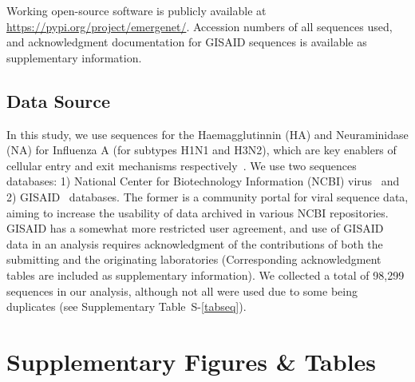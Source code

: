 \documentclass[onecolumn, compsoc,10pt]{IEEEtran}
\def\SUPPLEMENTARY{Supplementary\xspace}
\begin{document}
Working open-source software is publicly available at \href{https://pypi.org/project/quasinet/}{https://pypi.org/project/emergenet/}.
Accession numbers of all sequences used, and acknowledgment documentation for GISAID sequences is available as supplementary information.


\subsection*{Data Source}

In this study, we use sequences for the Haemagglutinnin (HA)  and Neuraminidase (NA) for Influenza A (for subtypes H1N1 and H3N2), which are key enablers of cellular entry and exit mechanisms respectively~\cite{mcauley2019influenza}. We use two sequences databases: 1) National Center for Biotechnology Information (NCBI) virus~\cite{hatcher2017virus} and 2) GISAID~\cite{bogner2006global} databases. The former is a community portal for viral sequence data, aiming to increase the usability of data archived in various NCBI repositories. GISAID has a somewhat more restricted user agreement, and use of GISAID data in an analysis requires acknowledgment of the contributions of both the submitting and the originating laboratories (Corresponding acknowledgment tables are included as supplementary information). We collected a total of 98,299 sequences in our analysis, although not all were used due to some being duplicates (see \SUPPLEMENTARY Table~S-\ref{tabseq}).








\clearpage                                                                      
\setcounter{figure}{0}
\renewcommand{\figurename}{Extended Data Figure}                               
\setcounter{table}{0}                                     
\renewcommand{\tablename}{Extended Data Table}                                 


\clearpage



\section*{Supplementary Figures \& Tables}


\end{document}
